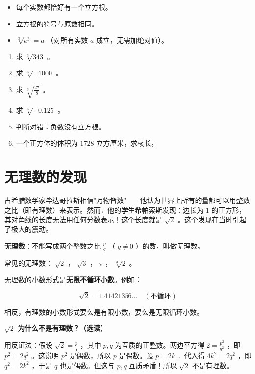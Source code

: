 \begin{keytakeaway}


\begin{itemize}
  \item 每个实数都恰好有一个立方根。
  \item 立方根的符号与原数相同。
  \item $\sqrt[3]{a^3} = a$ （对所有实数 $a$ 成立，无需加绝对值）。
\end{itemize}


\end{keytakeaway}

\begin{practice}


\begin{enumerate}
  \item 求 $\sqrt[3]{343}$ 。
  \item 求 $\sqrt[3]{-1000}$ 。
  \item 求 $\sqrt[3]{\frac{27}{8}}$ 。
  \item 求 $\sqrt[3]{-0.125}$ 。
  \item 判断对错：负数没有立方根。
  \item 一个正方体的体积为 $1728$ 立方厘米，求棱长。
\end{enumerate}


\end{practice}

\section*{无理数的发现}


\begin{explore}


古希腊数学家毕达哥拉斯相信"万物皆数"——他认为世界上所有的量都可以用整数之比（即有理数）来表示。然而，他的学生希帕索斯发现：边长为 $1$ 的正方形，其对角线的长度无法用任何分数表示！这个长度就是 $\sqrt{2}$ 。这个发现在当时引起了极大的震动。

\end{explore}

\begin{understand}


\textbf{无理数}：不能写成两个整数之比 $\frac{p}{q}$ （ $q \neq 0$ ）的数，叫做无理数。

常见的无理数： $\sqrt{2}$ ， $\sqrt{3}$ ， $\pi$ ， $\sqrt[3]{2}$ 。

无理数的小数形式是\textbf{无限不循环小数}。例如：

\[
\sqrt{2} = 1.41421356\ldots \quad (\text{不循环})
\]


相反，有理数的小数形式要么是有限小数，要么是无限循环小数。

\textbf{ $\sqrt{2}$ 为什么不是有理数？（选读）}

用反证法：假设 $\sqrt{2} = \frac{p}{q}$ ，其中 $p, q$ 为互质的正整数。两边平方得 $2 = \frac{p^2}{q^2}$ ，即 $p^2 = 2q^2$ 。这说明 $p^2$ 是偶数，所以 $p$ 是偶数。设 $p = 2k$ ，代入得 $4k^2 = 2q^2$ ，即 $q^2 = 2k^2$ ，于是 $q$ 也是偶数。但这与 $p, q$ 互质矛盾！所以 $\sqrt{2}$ 不是有理数。

\end{understand}

